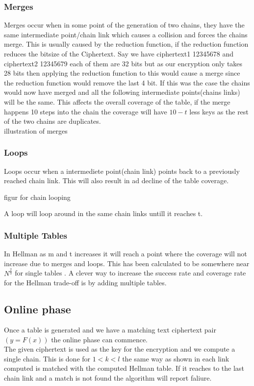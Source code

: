 \subsubsection{Merges}
Merges occur when in some point of the generation of two chains, they have the same intermediate point/chain link which causes a collision and  forces the chains merge. This is usually caused by the reduction function, if the reduction function reduces the bitsize of the Ciphertext. Say we have ciphertext1 12345678 and ciphertext2 12345679 each of them are 32 bits but as our encryption only takes 28 bits then applying the reduction function to this would cause a merge since the reduction function would remove the last 4 bit. If this was the case the chains would now have merged and all the following intermediate points(chains links) will be the same. This affects the overall coverage of the table, if the merge happens 10 steps into the chain the coverage will have $10 - t$ less keys as the rest of the two chains are duplicates.
\\
illustration of merges
\subsubsection{Loops}
Loops occur when a intermediete point(chain link) points back to a previously reached chain link. This will also result in ad decline of the table coverage.

figur for chain looping

A loop will loop around in the same chain links untill it reaches t.

\subsubsection{Multiple Tables}
In Hellman as m and t increases it will reach a point where the coverage will not increase due to merges and loops. This has been calculated to be somewhere near $N^{\frac{2}{3}}$ for single tables \cite{176}. A clever way to increase the success rate and coverage rate for the Hellman trade-off is by adding multiple tables.

\subsection{Online phase}
Once a table is generated and we have a matching text ciphertext pair $(y=F(x))$ the online phase can commence.\\
The given ciphertext is used as the key for the encryption and we compute a single chain. This is done for $1<k<l$ the same way as shown in \cite{HellSchema} each link computed is matched with the computed Hellman table. If it reaches to the last chain link and a match is not found the algorithm will report faliure.\\


